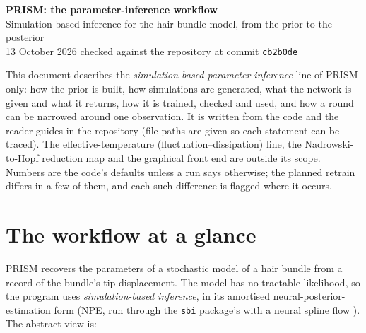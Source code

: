 \documentclass[10pt,a4paper]{article}
\newcommand{\code}[1]{\texttt{\detokenize{#1}}}
\begin{document}
\begin{center}
  {\LARGE\bfseries PRISM: the parameter-inference workflow}\\[0.5em]
  {\large Simulation-based inference for the hair-bundle model, from the prior to the posterior}\\[0.7em]
  {\small 13 October 2026 \quad\textbullet\quad checked against the repository at commit \texttt{cb2b0de}}
\end{center}
\vspace{0.4em}

\begin{keybox}[title={Scope of this summary}]
This document describes the \emph{simulation-based parameter-inference} line of PRISM only: how the prior is
built, how simulations are generated, what the network is given and what it returns, how it is trained,
checked and used, and how a round can be narrowed around one observation. It is written from the code and the
reader guides in the repository (file paths are given so each statement can be traced). The
effective-temperature (fluctuation--dissipation) line, the Nadrowski-to-Hopf reduction map and the
graphical front end are outside its scope. Numbers are the code's defaults unless a run says otherwise; the
planned retrain differs in a few of them, and each such difference is flagged where it occurs.
\end{keybox}

\tableofcontents

\section{The workflow at a glance}

PRISM recovers the parameters of a stochastic model of a hair bundle from a record of the bundle's tip
displacement. The model has no tractable likelihood, so the program uses \emph{simulation-based inference}, in
its amortised neural-posterior-estimation form (NPE, run through the \texttt{sbi} package's \code{SNPE} with a
neural spline flow \cite{papamakarios2016,greenberg2019,durkan2019,tejero2020}). The abstract view is:
\end{document}
